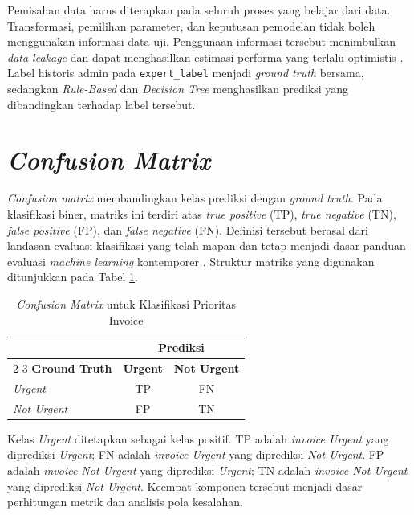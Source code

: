 Pemisahan data harus diterapkan pada seluruh proses yang belajar dari data. Transformasi, pemilihan parameter, dan keputusan pemodelan tidak boleh menggunakan informasi data uji. Penggunaan informasi tersebut menimbulkan \textit{data leakage} dan dapat menghasilkan estimasi performa yang terlalu optimistis \cite{KapoorNarayanan2023}. Label historis admin pada \texttt{expert\_label} menjadi \textit{ground truth} bersama, sedangkan \textit{Rule-Based} dan \textit{Decision Tree} menghasilkan prediksi yang dibandingkan terhadap label tersebut.

\section{\textit{Confusion Matrix}}

\textit{Confusion matrix} membandingkan kelas prediksi dengan \textit{ground truth}. Pada klasifikasi biner, matriks ini terdiri atas \textit{true positive} (TP), \textit{true negative} (TN), \textit{false positive} (FP), dan \textit{false negative} (FN). Definisi tersebut berasal dari landasan evaluasi klasifikasi yang telah mapan \cite{SokolovaLapalme2009} dan tetap menjadi dasar panduan evaluasi \textit{machine learning} kontemporer \cite{RainioEtAl2024}. Struktur matriks yang digunakan ditunjukkan pada Tabel \ref{tab:confusion-matrix-biner}.

\begin{table}[htbp]
    \centering
    \caption{\textit{Confusion Matrix} untuk Klasifikasi Prioritas Invoice}
    \label{tab:confusion-matrix-biner}
    \renewcommand{\arraystretch}{1.2}
    \begin{tabular}{lcc}
        \toprule
        & \multicolumn{2}{c}{\textbf{Prediksi}} \\
        \cmidrule(lr){2-3}
        \textbf{Ground Truth} & \textbf{Urgent} & \textbf{Not Urgent} \\
        \midrule
        \textit{Urgent} & TP & FN \\
        \textit{Not Urgent} & FP & TN \\
        \bottomrule
    \end{tabular}
\end{table}

Kelas \textit{Urgent} ditetapkan sebagai kelas positif. TP adalah \textit{invoice Urgent} yang diprediksi \textit{Urgent}; FN adalah \textit{invoice Urgent} yang diprediksi \textit{Not Urgent}. FP adalah \textit{invoice Not Urgent} yang diprediksi \textit{Urgent}; TN adalah \textit{invoice Not Urgent} yang diprediksi \textit{Not Urgent}. Keempat komponen tersebut menjadi dasar perhitungan metrik dan analisis pola kesalahan.

